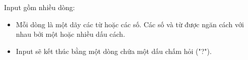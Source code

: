 Input gồm nhiều dòng:  
\begin{itemize}
	\item     Mỗi dòng là một dãy các từ hoặc các số. Các số và từ được ngăn cách với nhau bởi một hoặc nhiều dấu cách.   
	\item     Input sẽ kết thúc bằng một dòng chứa một dấu chấm hỏi ("?").   
\end{itemize}